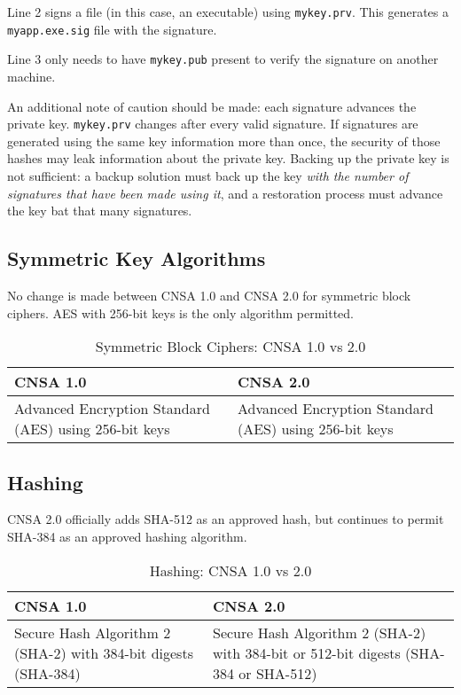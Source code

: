 Line 2 signs a file (in this case, an executable) using \texttt{mykey.prv}. This generates a \texttt{myapp.exe.sig} file with the signature.

Line 3 only needs to have \texttt{mykey.pub} present to verify the signature on another machine.

An additional note of caution should be made: each signature advances the private key. \texttt{mykey.prv} changes after every valid signature. If signatures are generated using the same key information more than once, the security of those hashes may leak information about the private key. Backing up the private key is not sufficient: a backup solution must back up the key \textit{with the number of signatures that have been made using it}, and a restoration process must advance the key bat that many signatures.

\subsection{Symmetric Key Algorithms}

No change is made between CNSA 1.0 and CNSA 2.0 for symmetric block ciphers. AES with 256-bit keys is the only algorithm permitted.

\begin{table}
\begin{tabular}{|p{}|p{}|}
	\hline
	\textbf{CNSA 1.0} & \textbf{CNSA 2.0} \\
	\hline
	Advanced Encryption Standard (AES) using 256-bit keys & Advanced Encryption Standard (AES) using 256-bit keys \\
	\hline
\end{tabular}
\caption{Symmetric Block Ciphers: CNSA 1.0 vs 2.0}
\end{table}

\subsection{Hashing}

CNSA 2.0 officially adds SHA-512 as an approved hash, but continues to permit SHA-384 as an approved hashing algorithm.
\begin{table}
\begin{tabular}{|p{}|p{}|}
	\hline
	\textbf{CNSA 1.0} & \textbf{CNSA 2.0} \\
	\hline
	Secure Hash Algorithm 2 (SHA-2) with 384-bit digests (SHA-384) & Secure Hash Algorithm 2 (SHA-2) with 384-bit or 512-bit digests (SHA-384 or SHA-512) \\
	\hline
\end{tabular}
\caption{Hashing: CNSA 1.0 vs 2.0}
\end{table}

